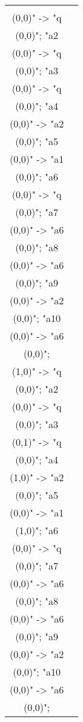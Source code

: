 \documentclass[12pt]{article}
\theoremstyle{defi}
\theoremstyle{not}
\theoremstyle{prob}
\begin{document}
    \begin{figure}
      \centering
      \begin{tabular}{cc}
        \begin{tikzpicture}[>=stealth]
        \graph [ layered layout, nodes = {scale=0.75, align=center} ] {
        "a1\\ (0,0)" -> "q\\ (0,0)";
        "a2\\ (0,0)" -> "q\\ (0,0)";
        "a3\\ (0,0)" -> "q\\ (0,0)";
        "a4\\ (0,0)" -> "a2\\ (0,0)";
        "a5\\ (0,0)" -> "a1\\ (0,0)";
        "a6\\ (0,0)" -> "q\\ (0,0)";
        "a7\\ (0,0)" -> "a6\\ (0,0)";
        "a8\\ (0,0)" -> "a6\\ (0,0)";
        "a9\\ (0,0)" -> "a2\\ (0,0)";
        "a10\\ (0,0)" -> "a6\\ (0,0)";
        };
        \end{tikzpicture} &

        \begin{tikzpicture}[>=stealth]
        \graph [ layered layout, nodes = {scale=0.75, align=center} ] {
        "a1\\ (1,0)" -> "q\\ (0,0)";
        "a2\\ (0,0)" -> "q\\ (0,0)";
        "a3\\ (0,1)" -> "q\\ (0,0)";
        "a4\\ (1,0)" -> "a2\\ (0,0)";
        "a5\\ (0,0)" -> "a1\\ (1,0)";
        "a6\\ (0,0)" -> "q\\ (0,0)";
        "a7\\ (0,0)" -> "a6\\ (0,0)";
        "a8\\ (0,0)" -> "a6\\ (0,0)";
        "a9\\ (0,0)" -> "a2\\ (0,0)";
        "a10\\ (0,0)" -> "a6\\ (0,0)";
        };
        \end{tikzpicture} \\


\end{tabular}
\end{figure}
\end{document}
